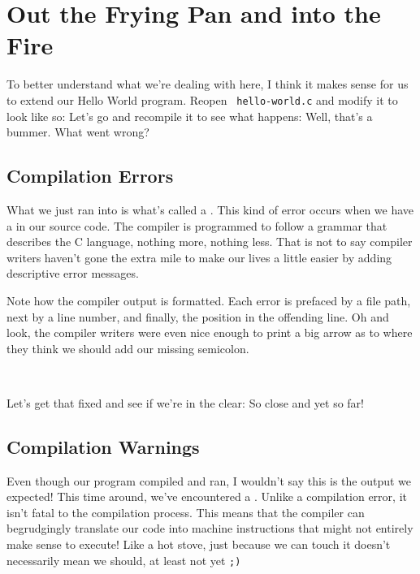 \section{Out the Frying Pan and into the Fire}

To better understand what we're dealing with here, I think it makes
sense for us to extend our Hello World program.  Reopen \texttt{%
hello-world.c} and modify it to look like so:
\noindent
Let's go and recompile it to see what happens:
\noindent
Well, that's a bummer.  What went wrong?

\subsection{Compilation Errors}

What we just ran into is what's called a .
This kind of error occurs when we have a  in our
source code.  The compiler is programmed to follow a grammar that
describes the C language, nothing more, nothing less.  That is not to
say compiler writers haven't gone the extra mile to make our lives a
little easier by adding descriptive error messages.

Note how the compiler output is formatted.  Each error is prefaced by a
file path, next by a line number, and finally, the position in the
offending line.  Oh and look, the compiler writers were even nice enough
to print a big arrow as to where they think we should add our missing
semicolon.

\

\noindent
Let's get that fixed and see if we're in the clear:
\noindent
{}
\noindent
{}
\noindent
So close and yet so far!

\subsection{Compilation Warnings}

Even though our program compiled and ran, I wouldn't say this is the
output we expected!  This time around, we've encountered a .  Unlike a compilation error, it isn't fatal to the
compilation process.  This means that the compiler can begrudgingly
translate our code into machine instructions that might not entirely
make sense to execute!  Like a hot stove, just because we can touch it
doesn't necessarily mean we should, at least not yet \texttt{;)}

